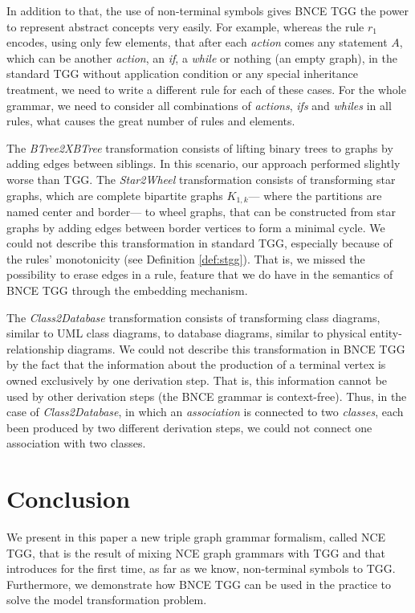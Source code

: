 \documentclass[runningheads]{llncs}
\begin{document}
In addition to that, the use of non-terminal symbols gives BNCE TGG the power to represent abstract concepts very easily. For example, whereas the rule $r_1$ encodes, using only few elements, that after each \emph{action} comes any statement $A$, which can be another \emph{action}, an \emph{if}, a \emph{while} or nothing (an empty graph), in the standard TGG without application condition or any special inheritance treatment, we need to write a different rule for each of these cases. For the whole grammar, we need to consider all combinations of \emph{actions}, \emph{ifs} and \emph{whiles} in all rules, what causes the great number of rules and elements.

The \emph{BTree2XBTree} transformation consists of lifting binary trees to graphs by adding edges between siblings. In this scenario, our approach performed slightly worse than TGG. The \emph{Star2Wheel} transformation consists of transforming star graphs, which are complete bipartite graphs $K_{1,k}$--- where the partitions are named center and border--- to wheel graphs, that can be constructed from star graphs by adding edges between border vertices to form a minimal cycle. We could not describe this transformation in standard TGG, especially because of the rules' monotonicity (see Definition \ref{def:stgg}). That is, we missed the possibility to erase edges in a rule, feature that we do have in the semantics of BNCE TGG through the embedding mechanism.

The \emph{Class2Database} transformation consists of transforming class diagrams, similar to UML class diagrams, to database diagrams, similar to physical entity-relationship diagrams. We could not describe this transformation in BNCE TGG by the fact that the information about the production of a terminal vertex is owned exclusively by one derivation step. That is, this information cannot be used by other derivation steps (the BNCE grammar is context-free). Thus, in the case of \emph{Class2Database}, in which an \textit{association} is connected to two \textit{classes}, each been produced by two different derivation steps, we could not connect one association with two classes.

\section{Conclusion}
\label{sec:conclusion}
We present in this paper a new triple graph grammar formalism, called NCE TGG, that is the result of mixing NCE graph grammars \cite{janssens1982graph} with TGG \cite{schurr1994specification} and that introduces for the first time, as far as we know, non-terminal symbols to TGG. Furthermore, we demonstrate how BNCE TGG can be used in the practice to solve the model transformation problem.
\end{document}
